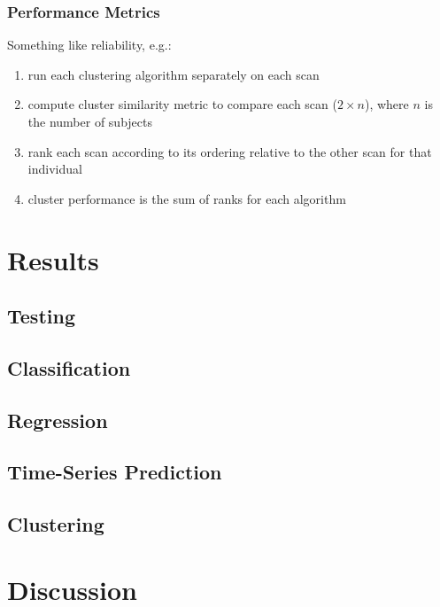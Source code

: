 \documentclass[12pt]{article}
\begin{document}
\subsubsection{Performance Metrics}

Something like reliability, e.g.:

\begin{enumerate} \itemsep0pt
	\item run each clustering algorithm separately on each scan
	\item compute cluster similarity metric to compare each scan ($2 \times n$), where $n$ is the number of subjects
	\item rank each scan according to its ordering relative to the other scan for that individual
	\item cluster performance is the sum of ranks for each algorithm
\end{enumerate} 





\section{Results} \label{sec:results}

\subsection{Testing}

\subsection{Classification}

\subsection{Regression}

\subsection{Time-Series Prediction}


\subsection{Clustering}

\section{Discussion} \label{sec:disc}


\newpage
\small{


}
\end{document}
